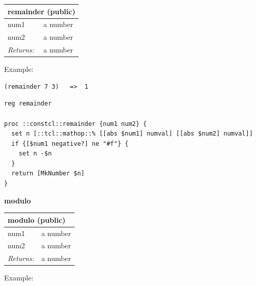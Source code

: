 \documentclass[twoside,9pt]{report}
\begin{document}
\begin{tabular}{ |l l| }
\hline
\multicolumn{2}{|l|}{remainder (public)} \\
\hline
num1 & a number \\
num2 & a number \\
\textit{Returns:} & a number \\
\hline
\end{tabular}


Example:

\noindent\makebox[\linewidth]{\rule{\linewidth}{0.4pt}}
\begin{lstlisting}
(remainder 7 3)   =>  1
\end{lstlisting}
\noindent\makebox[\linewidth]{\rule{\linewidth}{0.4pt}}
\noindent\makebox[\linewidth]{\rule{\linewidth}{0.4pt}}
\begin{lstlisting}
reg remainder
 
proc ::constcl::remainder {num1 num2} {
  set n [::tcl::mathop::% [[abs $num1] numval] [[abs $num2] numval]]
  if {[$num1 negative?] ne "#f"} {
    set n -$n
  }
  return [MkNumber $n]
}
\end{lstlisting}
\noindent\makebox[\linewidth]{\rule{\linewidth}{0.4pt}}

\textbf{modulo}

\begin{tabular}{ |l l| }
\hline
\multicolumn{2}{|l|}{modulo (public)} \\
\hline
num1 & a number \\
num2 & a number \\
\textit{Returns:} & a number \\
\hline
\end{tabular}


Example:
\end{document}
